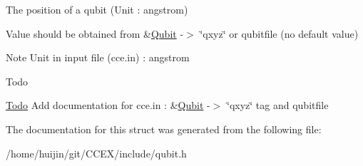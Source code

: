 The position of a qubit (Unit \-: angstrom) 

Value should be obtained from \&\hyperlink{structQubit}{Qubit} -\/$>$ \char`\"{}qxyz\char`\"{} or qubitfile (no default value) \begin{DoxyNote}{Note}
Unit in input file (cce.\-in) \-: angstrom 
\end{DoxyNote}
\begin{DoxyRefDesc}{Todo}
\item[\hyperlink{todo__todo000018}{Todo}]Add documentation for cce.\-in \-: \&\hyperlink{structQubit}{Qubit} -\/$>$ \char`\"{}qxyz\char`\"{} tag and qubitfile \end{DoxyRefDesc}


The documentation for this struct was generated from the following file\-:\begin{DoxyCompactItemize}
\item 
/home/huijin/git/\-C\-C\-E\-X/include/qubit.\-h\end{DoxyCompactItemize}
